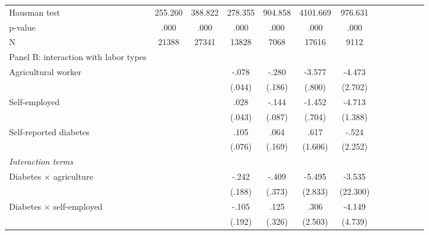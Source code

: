 \documentclass[12pt,english]{article}
\begin{document}
\begin{table}[p]
\begin{center}
\begin{adjustbox}{max width=\linewidth}
\begin{threeparttable}
{\begin{tabular}{l*{6}{S
S}}
Hausman test    &  255.260         &  388.822         &  278.355         &  904.858         & 4101.669         &  976.631         \\
\hspace*{10mm}p-value&     .000         &     .000         &     .000         &     .000         &     .000         &     .000         \\
N               &    21388         &    27341         &    13828         &     7068         &    17616         &     9112         \\
\midrule
\addlinespace
Panel B: interaction with labor types &&&&&&\\ 
\addlinespace
Agricultural worker&         &         &    -.078\sym{*}  &    -.280         &   -3.577\sym{***}&   -4.473\sym{*}  \\
                &         &         &   (.044)         &   (.186)         &   (.800)         &  (2.702)         \\
Self-employed   &         &         &     .028         &    -.144\sym{*}  &   -1.452\sym{**} &   -4.713\sym{***}\\
                &         &         &   (.043)         &   (.087)         &   (.704)         &  (1.388)         \\
Self-reported diabetes&         &         &     .105         &     .064         &     .617         &    -.524         \\
                &         &         &   (.076)         &   (.169)         &  (1.606)         &  (2.252)         \\
\textit{Interaction terms} &&&&&&\\                
\hspace*{5mm}Diabetes $\times$ agriculture&         &         &    -.242         &    -.409         &   -5.495\sym{*}  &   -3.535         \\
                &         &         &   (.188)         &   (.373)         &  (2.833)         & (22.300)         \\
\hspace*{5mm}Diabetes $\times$ self-employed&         &         &    -.105         &     .125         &     .306         &   -4.149         \\
                &         &         &   (.192)         &   (.326)         &  (2.503)         &  (4.739)         \\


\end{tabular}}
\end{threeparttable}
\end{adjustbox}
\end{center}
\end{table}
\end{document}
